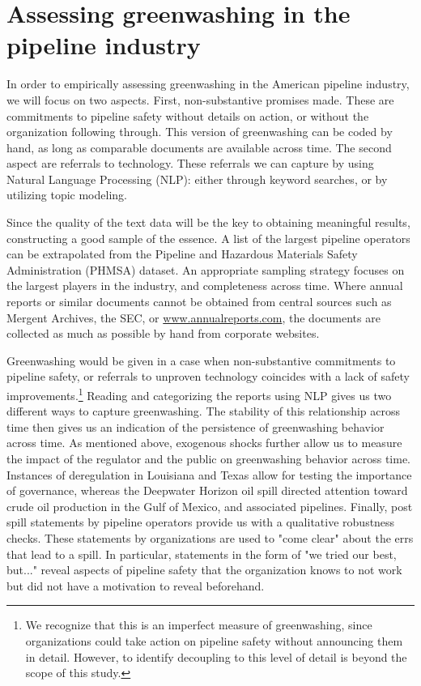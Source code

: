 \documentclass[12pt, man, natbib]{apa6}
\begin{document}
	\section{Assessing greenwashing in the pipeline industry}
	
	In order to empirically assessing greenwashing in the American pipeline industry, we will focus on two aspects. First, non-substantive promises made. These are commitments to pipeline safety without details on action, or without the organization following through. This version of greenwashing can be coded by hand, as long as comparable documents are available across time. The second aspect are referrals to technology. These referrals we can capture by using Natural Language Processing (NLP): either through keyword searches, or by utilizing topic modeling.
	
	Since the quality of the text data will be the key to obtaining meaningful results, constructing a good sample of the essence. A list of the largest pipeline operators can be extrapolated from the Pipeline and Hazardous Materials Safety Administration (PHMSA) dataset. An appropriate sampling strategy focuses on the largest players in the industry, and completeness across time. Where annual reports or similar documents cannot be obtained from central sources such as Mergent Archives, the SEC, or \url{www.annualreports.com}, the documents are collected as much as possible by hand from corporate websites.
	
	Greenwashing would be given in a case when non-substantive commitments to pipeline safety, or referrals to unproven technology coincides with a lack of safety improvements.\footnote{We recognize that this is an imperfect measure of greenwashing, since organizations could take action on pipeline safety without announcing them in detail. However, to identify decoupling to this level of detail is beyond the scope of this study.} Reading and categorizing the reports using NLP gives us two different ways to capture greenwashing. The stability of this relationship across time then gives us an indication of the persistence of greenwashing behavior across time. As mentioned above, exogenous shocks further allow us to measure the impact of the regulator and the public on greenwashing behavior across time. Instances of deregulation in Louisiana and Texas allow for testing the importance of governance, whereas the Deepwater Horizon oil spill directed attention toward crude oil production in the Gulf of Mexico, and associated pipelines. Finally, post spill statements by pipeline operators provide us with a qualitative robustness checks. These statements by organizations are used to "come clear" about the errs that lead to a spill. In particular, statements in the form of "we tried our best, but..." reveal aspects of pipeline safety that the organization knows to not work but did not have a motivation to reveal beforehand.
	
\end{document}
